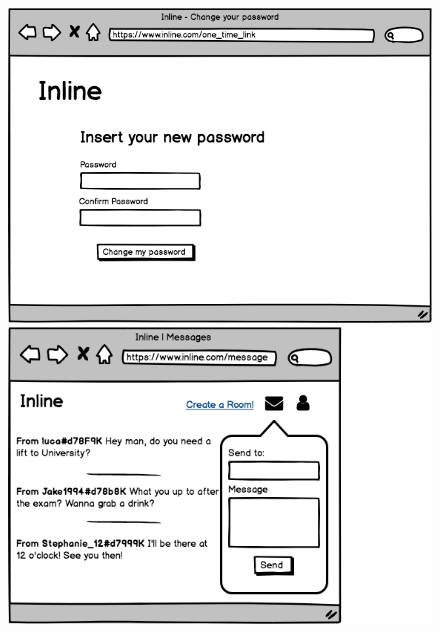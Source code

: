 	\begin{figure}[H]
		\centering
		\begin{minipage}[b]{0.45\textwidth}
			\includegraphics[width=\textwidth]{./Mockup/password.png}
		\end{minipage}
		\hfill
		\begin{minipage}[b]{0.45\textwidth}
			\includegraphics[width=\textwidth]{./Mockup/pms.png}
		\end{minipage}
	\end{figure}

